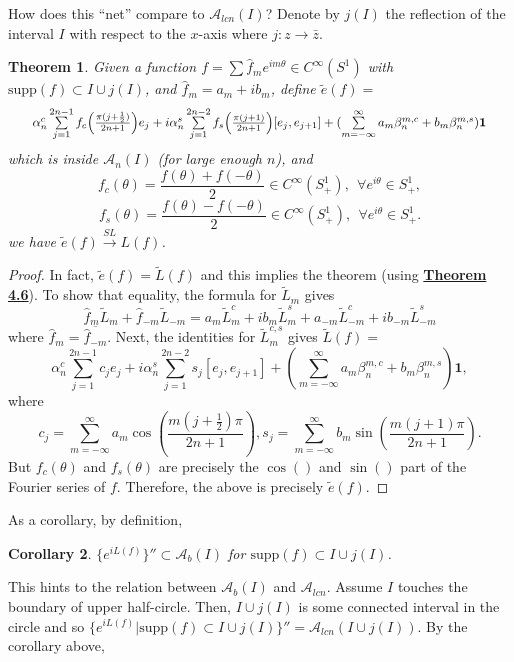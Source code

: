 \documentclass[twoside,11pt,titlepage]{amsart}
\renewcommand{\=}[1]{\stackrel{#1}{=}} %
\newtheorem{thm}{Theorem}[section]
\newtheorem{cor}[thm]{Corollary}
\theoremstyle{definition}
\theoremstyle{remark}
\begin{document}
How does this ``net'' compare to $\mathcal{A}_{lcn}(I)$? Denote by $j(I)$ the reflection of the interval $I$ with respect to the $x$-axis where $j:z \rightarrow \bar{z}$.
\begin{thm}\label{thm4.11}
Given a function $f=\sum \hat{f}_me^{im\theta} \in C^\infty(S^1)$ with $\text{supp}(f) \subset I \cup j(I)$, and $\hat{f}_m=a_m+ib_m$, define $\widetilde{e}(f)=$
\begin{gather*}
\scalebox{0.9}{$\alpha_n^c\sum\limits_{j=1}^{2n-1} f_c\Big(\frac{\pi(j+\frac{1}{2})}{2n+1}\Big)e_j +i\alpha_n^s \sum\limits_{j=1}^{2n-2}f_s\Big(\frac{\pi(j+1)}{2n+1}\Big)[e_{j},e_{j+1}]+(\sum\limits_{m=-\infty}^\infty a_m\beta_n^{m,c}+b_m\beta_n^{m,s})\textbf{1}$}
\end{gather*}
which is inside $\mathcal{A}_n(I)$ (for large enough $n$), and
$$f_c(\theta)=\frac{f(\theta)+f(-\theta)}{2} \in C^\infty(S^1_+), \ \ \forall e^{i\theta} \in S^1_+,$$
$$f_s(\theta)=\frac{f(\theta)-f(-\theta)}{2} \in C^\infty(S^1_+), \ \ \forall e^{i\theta} \in S^1_+.$$
we have $\widetilde{e}(f) \xrightarrow{SL} L(f)$.
\end{thm}
\begin{proof}
In fact, $\widetilde{e}(f)=\widetilde{L}(f)$ and this implies the theorem (using \hyperref[thm4.6]{\textbf{Theorem 4.6}}). To show that equality, the formula for $\widetilde{L}_m$ gives
$$\hat{f}_m\widetilde{L}_m+\hat{f}_{-m}\widetilde{L}_{-m}=a_m\widetilde{L}_m^c+ib_m\widetilde{L}_m^s+a_{-m}\widetilde{L}_{-m}^c+ib_{-m}\widetilde{L}_{-m}^s$$
where $\hat{f}_m=\overline{\hat{f}_{-m}}$. Next, the identities for $\widetilde{L}_m^{c,s}$ gives $\widetilde{L}(f)=$
$$\alpha_n^c\sum_{j=1}^{2n-1} c_je_j + i\alpha_n^s\sum_{j=1}^{2n-2}s_j[e_{j},e_{j+1}]+(\sum_{m=-\infty}^{\infty} a_m\beta_n^{m,c}+b_m\beta_n^{m,s})\textbf{1},$$
where 
$$c_j=\sum_{m=-\infty}^{\infty}a_m\cos(\frac{m(j+\frac{1}{2})\pi}{2n+1}), s_j=\sum_{m=-\infty}^{\infty}b_m\sin(\frac{m(j+1)\pi}{2n+1}).$$
But $f_c(\theta)$ and $f_s(\theta)$ are precisely the $\cos()$ and $\sin()$ part of the Fourier series of $f$. Therefore, the above is precisely $\widetilde{e}(f)$. 
\end{proof}
As a corollary, by definition,
\begin{cor} \label{cor4.12}
$\{e^{iL(f)}\}'' \subset \mathcal{A}_b(I)$ for $\text{supp}(f) \subset I \cup j(I)$.
\end{cor}
This hints to the relation between $\mathcal{A}_b(I)$ and $\mathcal{A}_{lcn}$. Assume $I$ touches the boundary of upper half-circle. Then, $I \cup j(I)$ is some connected interval in the circle and so $\{e^{iL(f)}|\text{supp}(f) \subset I \cup j(I)\}'' = \mathcal{A}_{lcn}(I \cup j(I))$. By the corollary above,
\end{document}
